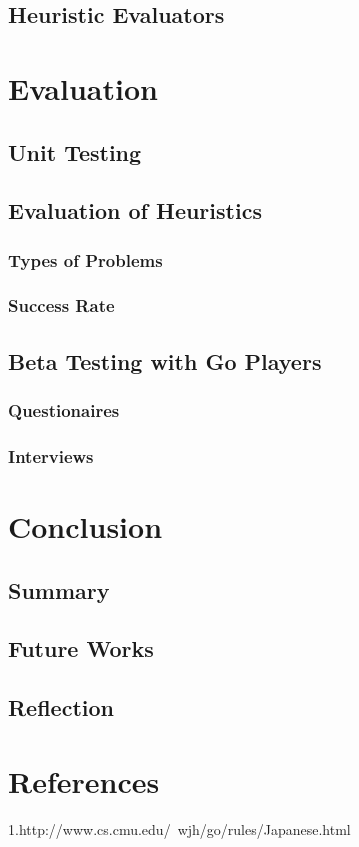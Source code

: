 \documentclass{l4proj}
\begin{document}
\section{Heuristic Evaluators}








\chapter{Evaluation}

\section{Unit Testing}

\section{Evaluation of Heuristics}
\subsection{Types of Problems}
\subsection{Success Rate}

\section{Beta Testing with Go Players}
\subsection{Questionaires}
\subsection{Interviews}






\chapter{Conclusion}

\section{Summary}

\section{Future Works}

\section{Reflection}


\chapter{References}
1.http://www.cs.cmu.edu/~wjh/go/rules/Japanese.html
\end{document}
